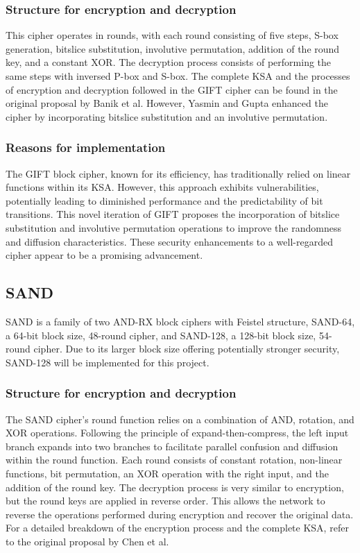 \documentclass[conference]{IEEEtran}
\begin{document}
\subsubsection{Structure for encryption and decryption}

This cipher operates in rounds, with each round consisting of five steps, S-box generation, bitslice substitution, involutive permutation, addition of the round key, and a constant XOR. The decryption process consists of performing the same steps with inversed P-box and S-box. The complete KSA and the processes of encryption and decryption followed in the GIFT cipher can be found in the original proposal by Banik et al\cite{GIFT}. However, Yasmin and Gupta enhanced the cipher by incorporating bitslice substitution and an involutive permutation\cite{yasmin2023modified}.

\subsubsection{Reasons for implementation}

The GIFT block cipher, known for its efficiency, has traditionally relied on linear functions within its KSA. However, this approach exhibits vulnerabilities, potentially leading to diminished performance and the predictability of bit transitions. This novel iteration of GIFT proposes the incorporation of bitslice substitution and involutive permutation operations to improve the randomness and diffusion characteristics. These security enhancements to a well-regarded cipher appear to be a promising advancement.

\subsection{SAND}
SAND is a family of two AND-RX block ciphers with Feistel structure, SAND-64, a 64-bit block size, 48-round cipher, and SAND-128, a 128-bit block size, 54-round cipher. Due to its larger block size offering potentially stronger security, SAND-128 will be implemented for this project\cite{SAND}.
\subsubsection{Structure for encryption and decryption}
The SAND cipher's round function relies on a combination of AND, rotation, and XOR operations. Following the principle of expand-then-compress, the left input branch expands into two branches to facilitate parallel confusion and diffusion within the round function. Each round consists of constant rotation, non-linear functions, bit permutation, an XOR operation with the right input, and the addition of the round key. The decryption process is very similar to encryption, but the round keys are applied in reverse order. This allows the network to reverse the operations performed during encryption and recover the original data. For a detailed breakdown of the encryption process and the complete KSA, refer to the original proposal by Chen et al\cite{SAND}.
\end{document}
